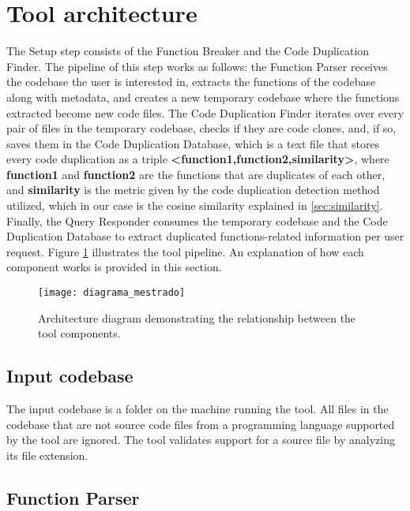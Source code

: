 \en

\section{Tool architecture}
\label{subsec:architecture}

The Setup step consists of the Function Breaker and the Code Duplication Finder. The pipeline of this step works as follows: the Function Parser receives the codebase the user is interested in, extracts the functions of the codebase along with metadata, and creates a new temporary codebase where the functions extracted become new code files. The Code Duplication Finder iterates over every pair of files in the temporary codebase, checks if they are code clones, and, if so, saves them in the Code Duplication Database, which is a text file that stores every code duplication as a triple \textbf{<function1,function2,similarity>}, where \textbf{function1} and \textbf{function2} are the functions that are duplicates of each other, and \textbf{similarity} is the metric given by the code duplication detection method utilized, which in our case is the cosine similarity explained in \ref{sec:similarity}. Finally, the Query Responder consumes the temporary codebase and the Code Duplication Database to extract duplicated functions-related information per user request. Figure \ref{fig:diagram} illustrates the tool pipeline. An explanation of how each component works is provided in this section.

\begin{figure}
\texttt{[image: diagrama\_mestrado]}
\caption{Architecture diagram demonstrating the relationship between the tool components.}
\label{fig:diagram}
\end{figure}

\subsection{Input codebase}

The input codebase is a folder on the machine running the tool. All files in the codebase that are not source code files from a programming language supported by the tool are ignored. The tool validates support for a source file by analyzing its file extension.

\subsection{Function Parser}

